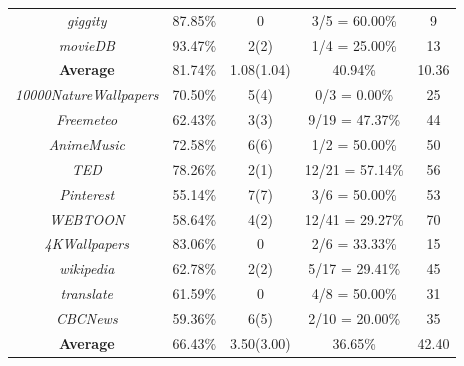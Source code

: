 \documentclass[sigconf,review, anonymous]{acmart}
\begin{document}
\begin{table}
\begin{tabular}{|c|c|c|c|c|}
{\it giggity} &87.85\% &0 &3/5 = 60.00\% &9\\
{\it movieDB} &93.47\% &2(2) &1/4 = 25.00\% &13
\\
\hline
{\bf Average} &81.74\% &1.08(1.04) &40.94\% &10.36\\
\hline
\hline
{\it 10000NatureWallpapers} &70.50\% &5(4) &0/3 = 0.00\% &25\\
{\it Freemeteo} &62.43\% &3(3) &9/19 = 47.37\% &44\\
{\it AnimeMusic} &72.58\% &6(6) &1/2 = 50.00\% &50\\
{\it TED} &78.26\% &2(1) &12/21 = 57.14\% &56\\
{\it Pinterest} &55.14\% &7(7) &3/6 = 50.00\% &53\\
{\it WEBTOON} &58.64\% &4(2) &12/41 = 29.27\% &70\\
{\it 4KWallpapers} &83.06\% &0 &2/6 = 33.33\% &15\\
{\it wikipedia} &62.78\% &2(2) &5/17 = 29.41\% &45\\
{\it translate} &61.59\% &0 &4/8 = 50.00\% &31\\
{\it CBCNews} &59.36\% &6(5) &2/10 = 20.00\% &35\\
\hline
{\bf Average} &66.43\% &3.50(3.00) &36.65\% &42.40
\\
\hline
\end{tabular}
\label{tab:result}
\end{table}
\end{document}
